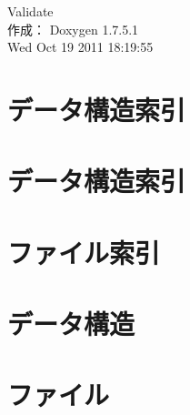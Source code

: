 \documentclass[a4paper]{book}
\begin{document}
\hypersetup{pageanchor=false,citecolor=blue}
\begin{titlepage}
\vspace*{7cm}
\begin{center}
{\Large \-Validate }\\
\vspace*{1cm}
{\large 作成： Doxygen 1.7.5.1}\\
\vspace*{0.5cm}
{\small Wed Oct 19 2011 18:19:55}\\
\end{center}
\end{titlepage}
\clearemptydoublepage
{}
\tableofcontents
\clearemptydoublepage
{}
\hypersetup{pageanchor=true,citecolor=blue}
\chapter{データ構造索引}

\chapter{データ構造索引}

\chapter{ファイル索引}

\chapter{データ構造}





















\chapter{ファイル}





















\printindex
\end{document}
